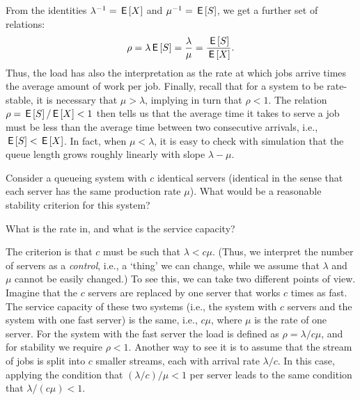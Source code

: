 From the identities $\lambda^{-1} = \,\mathsf{E}\left[X\right]$ and $\mu^{-1} = \,\mathsf{E}\left[S\right]$, we get
a further set of relations:
\begin{equation*}
  \rho = \lambda \,\mathsf{E}\left[S\right] = \frac{\lambda}{\mu} = \frac{\,\mathsf{E}\left[S\right]}{\,\mathsf{E}\left[X\right]}.
\end{equation*}
Thus, the load has also the interpretation as the rate at which jobs
arrive times the average amount of work per job.  Finally,
recall that for a system to be rate-stable, it is necessary that
$\mu> \lambda$, implying in turn that $\rho < 1$. The relation
$\rho=\,\mathsf{E}\left[S\right]/ \,\mathsf{E}\left[X\right] < 1$ then tells us that the average time it takes to
serve a job must be less than the average time between two consecutive
arrivals, i.e., $\,\mathsf{E}\left[S\right] < \,\mathsf{E}\left[X\right]$. In fact, when $\mu < \lambda$, it is easy to check with simulation that the queue length
grows roughly linearly with slope $\lambda - \mu$.


\begin{exercise}[\faFlask]
  Consider a queueing system with $c$ identical servers (identical in
  the sense that each server has the same production rate $\mu$). What would be a reasonable stability criterion for this system? 
  \begin{hint}
What is the rate in, and what is the service capacity?
  \end{hint}
  \begin{solution}
    The criterion is that $c$ must be such that $\lambda <
    c\mu$.
    (Thus, we interpret the number of servers as a \emph{control},
    i.e., a `thing' we can change, while we assume that $\lambda$ and
    $\mu$ cannot be easily changed.) To see this, we can take two
  different points of view.  Imagine that the $c$ servers are replaced
  by one server that works $c$ times as fast. The service capacity of
  these two systems (i.e., the system with $c$ servers and the system
  with one fast server) is the same, i.e., $c\mu$, where $\mu$ is the
  rate of one server. For the system with the fast server the load is
  defined as $\rho =\lambda/c\mu$, and for stability we require
  $\rho<1$.  Another way to see it is to assume that the stream of
  jobs is split into $c$ smaller streams, each with arrival rate
  $\lambda/c$.  In this case, applying the condition that
  $(\lambda/c )/\mu<1$ per server leads to the same condition that
  $\lambda/(c\mu) < 1$.
  \end{solution}
\end{exercise}

